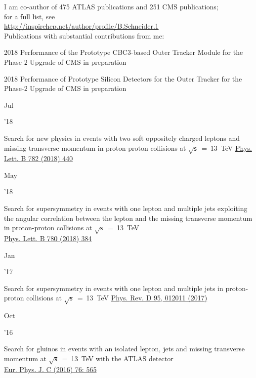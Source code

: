 \documentclass[]{cv} %
\begin{document}
\begin{entrylist}

  \entry
  {}
  {I am co-author of 475 ATLAS publications and 251 CMS publications;\\
  for a full list, see \\
    \href{http://inspirehep.net/author/profile/B.Schneider.1}{http://inspirehep.net/author/profile/B.Schneider.1}\\
  Publications with substantial contributions from me:}
  {}
  {\vspace*{\spacingPubs}}

  \entry
  {2018}
  {Performance of the Prototype CBC3-based Outer Tracker Module for the Phase-2
  Upgrade of CMS}
  {in preparation}
  {\vspace*{\spacingPubs}}

  \entry
  {2018}
  {Performance of Prototype Silicon Detectors for the Outer Tracker for the
  Phase-2 Upgrade of CMS}
  {in preparation}
  {\vspace*{\spacingPubs}}

  \entry
  {\parbox[t]{\parboxWidthOne}{Jul}\parbox[t]{\parboxWidthTwo}{\hfill '18}}
  {Search for new physics in events with two soft oppositely charged leptons and missing transverse momentum in proton-proton collisions at $\sqrt{\mathsf{s}}$~=~13~TeV}
    {\href{https://www.sciencedirect.com/science/article/pii/S037026931830426X}{Phys. Lett. B 782 (2018) 440}}
  {\vspace*{\spacingPubs}}

  \entry
  {\parbox[t]{\parboxWidthOne}{May}\parbox[t]{\parboxWidthTwo}{\hfill '18}}
  {Search for supersymmetry in events with one lepton and multiple jets exploiting the angular correlation between the lepton and the missing transverse momentum in proton-proton collisions at $\sqrt{\mathsf{s}}$~=~13~TeV\\}
    {\href{https://www.sciencedirect.com/science/article/pii/S037026931830217X}{Phys. Lett. B 780 (2018) 384}}
  {\vspace*{\spacingPubs}}

  \entry
  {\parbox[t]{\parboxWidthOne}{Jan}\parbox[t]{\parboxWidthTwo}{\hfill '17}}
  {Search for supersymmetry in events with one lepton and multiple jets in proton-proton collisions at $\sqrt{\mathsf{s}}$~=~13~TeV}
    {\href{https://journals.aps.org/prd/abstract/10.1103/PhysRevD.95.012011}{Phys. Rev. D 95, 012011 (2017)}}
  {\vspace*{\spacingPubs}}

  \entry
  {\parbox[t]{\parboxWidthOne}{Oct}\parbox[t]{\parboxWidthTwo}{\hfill '16}}
  {Search for gluinos in events with an isolated lepton, jets and missing transverse momentum at $\sqrt{\mathsf{s}}$~=~13~TeV with the ATLAS detector\\}
    {\href{https://link.springer.com/article/10.1140\%2Fepjc\%2Fs10052-016-4397-x}{Eur. Phys. J. C (2016) 76: 565}}
  {\vspace*{\spacingPubs}}


\end{entrylist}
\end{document}
